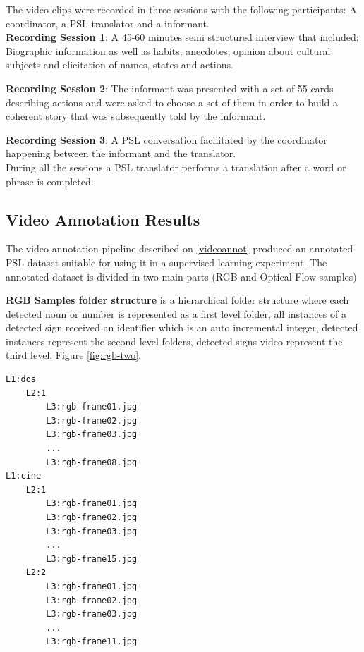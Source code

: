 \documentclass[twocolumn,conference]{article}
\begin{document}
The video clips were recorded in three sessions with the following participants: A coordinator, a PSL \cite{lsp_2015} translator and a informant.\\

\textbf{Recording Session 1}: A 45-60 minutes semi structured interview that included: Biographic information as well as habits, anecdotes, opinion about cultural subjects and elicitation of names, states and actions. 

\textbf{Recording Session 2}: The informant was presented with a set of 55 cards describing actions and were asked to choose a set of them in order to build a coherent story that was subsequently told by the informant.

\textbf{Recording Session 3}: A PSL \cite{lsp_2015} conversation facilitated by the coordinator happening between the informant and the translator.\\

During all the sessions a PSL \cite{lsp_2015} translator performs a translation after a word or phrase is completed.

\subsection{Video Annotation Results}
The video annotation pipeline described on \ref{videoannot} produced an annotated PSL dataset suitable for using it in a supervised learning experiment. The annotated dataset is divided in two main parts (RGB and Optical Flow samples)

\textbf{RGB Samples folder structure} is a hierarchical folder structure where each detected noun or number is represented as a first level folder, all instances of a detected sign received an identifier which is an auto incremental integer, detected instances represent the second level folders, detected signs video represent the third level, Figure \ref{fig:rgb-two}.
\begin{lstlisting}[caption=RGB Samples Folder Structure example, basicstyle=\ttfamily\small]
L1:dos
	L2:1
		L3:rgb-frame01.jpg
		L3:rgb-frame02.jpg
		L3:rgb-frame03.jpg
		...
		L3:rgb-frame08.jpg
L1:cine
	L2:1
		L3:rgb-frame01.jpg
		L3:rgb-frame02.jpg
		L3:rgb-frame03.jpg
		...
		L3:rgb-frame15.jpg
	L2:2
		L3:rgb-frame01.jpg
		L3:rgb-frame02.jpg
		L3:rgb-frame03.jpg
		...
		L3:rgb-frame11.jpg
\end{lstlisting}\label{list:rgb-samples-folders}
\end{document}

